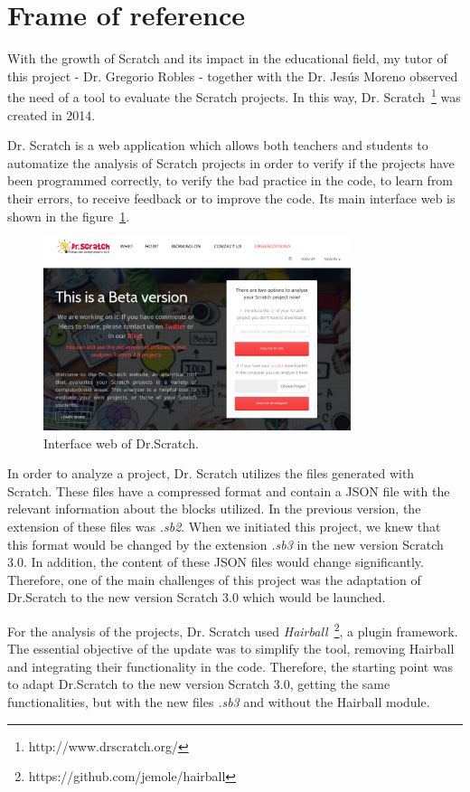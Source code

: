 \section{Frame of reference}
\label{sec:reference}

With the growth of Scratch and its impact in the educational field, my tutor of this project - Dr. Gregorio Robles - together with the Dr. Jesús Moreno observed the need of a tool to evaluate the Scratch projects. In this way, Dr. Scratch~\footnote{http://www.drscratch.org/} was created in 2014.

Dr. Scratch is a web application which allows both teachers and students to automatize the analysis of Scratch projects in order to verify if the projects have been programmed correctly, to verify the bad practice in the code, to learn from their errors, to receive feedback or to improve the code. Its main interface web is shown in the figure~\ref{fig:dr_scratch}.

\begin{figure}[h]
  \centering
  \includegraphics[width=9cm, keepaspectratio]{img/dr_scratch.png}
  \caption{Interface web of Dr.Scratch.}
  \label{fig:dr_scratch}
\end{figure}

In order to analyze a project, Dr. Scratch utilizes the files generated with Scratch. These files have a compressed format and contain a JSON file with the relevant information about the blocks utilized. In the previous version, the extension of these files was \textit{.sb2}. When we initiated this project, we knew that this format would be changed by the extension \textit{.sb3} in the new version Scratch 3.0. In addition, the content of these JSON files would change significantly. Therefore, one of the main challenges of this project was the adaptation of Dr.Scratch to the new version Scratch 3.0 which would be launched. 

For the analysis of the projects, Dr. Scratch used \textit{Hairball}~\footnote{https://github.com/jemole/hairball}, a plugin framework. The essential objective of the update was to simplify the tool, removing Hairball and integrating their functionality in the code. Therefore, the starting point was to adapt Dr.Scratch to the new version Scratch 3.0, getting the same functionalities, but with the new files \textit{.sb3} and without the Hairball module.

